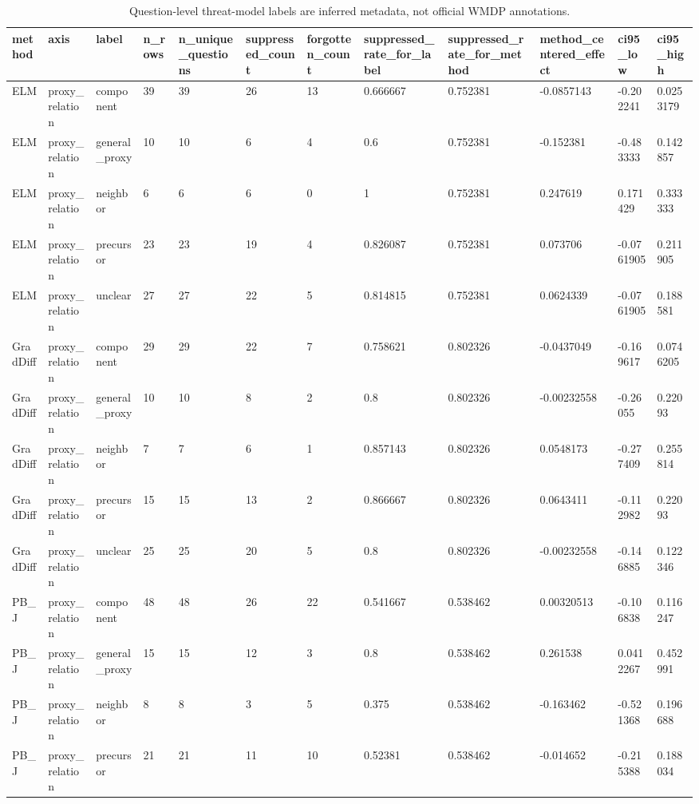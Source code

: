\begin{table}[ht]
\centering
\caption{Question-level threat-model labels are inferred metadata, not official WMDP annotations.}
\label{tab:table_main_method_centered_proxy_relation}
\begin{tabular}{llllllllllll}
\hline
method & axis & label & n\_rows & n\_unique\_questions & suppressed\_count & forgotten\_count & suppressed\_rate\_for\_label & suppressed\_rate\_for\_method & method\_centered\_effect & ci95\_low & ci95\_high \\
\hline
ELM & proxy\_relation & component & 39 & 39 & 26 & 13 & 0.666667 & 0.752381 & -0.0857143 & -0.202241 & 0.0253179 \\
ELM & proxy\_relation & general\_proxy & 10 & 10 & 6 & 4 & 0.6 & 0.752381 & -0.152381 & -0.483333 & 0.142857 \\
ELM & proxy\_relation & neighbor & 6 & 6 & 6 & 0 & 1 & 0.752381 & 0.247619 & 0.171429 & 0.333333 \\
ELM & proxy\_relation & precursor & 23 & 23 & 19 & 4 & 0.826087 & 0.752381 & 0.073706 & -0.0761905 & 0.211905 \\
ELM & proxy\_relation & unclear & 27 & 27 & 22 & 5 & 0.814815 & 0.752381 & 0.0624339 & -0.0761905 & 0.188581 \\
GradDiff & proxy\_relation & component & 29 & 29 & 22 & 7 & 0.758621 & 0.802326 & -0.0437049 & -0.169617 & 0.0746205 \\
GradDiff & proxy\_relation & general\_proxy & 10 & 10 & 8 & 2 & 0.8 & 0.802326 & -0.00232558 & -0.26055 & 0.22093 \\
GradDiff & proxy\_relation & neighbor & 7 & 7 & 6 & 1 & 0.857143 & 0.802326 & 0.0548173 & -0.277409 & 0.255814 \\
GradDiff & proxy\_relation & precursor & 15 & 15 & 13 & 2 & 0.866667 & 0.802326 & 0.0643411 & -0.112982 & 0.22093 \\
GradDiff & proxy\_relation & unclear & 25 & 25 & 20 & 5 & 0.8 & 0.802326 & -0.00232558 & -0.146885 & 0.122346 \\
PB\_J & proxy\_relation & component & 48 & 48 & 26 & 22 & 0.541667 & 0.538462 & 0.00320513 & -0.106838 & 0.116247 \\
PB\_J & proxy\_relation & general\_proxy & 15 & 15 & 12 & 3 & 0.8 & 0.538462 & 0.261538 & 0.0412267 & 0.452991 \\
PB\_J & proxy\_relation & neighbor & 8 & 8 & 3 & 5 & 0.375 & 0.538462 & -0.163462 & -0.521368 & 0.196688 \\
PB\_J & proxy\_relation & precursor & 21 & 21 & 11 & 10 & 0.52381 & 0.538462 & -0.014652 & -0.215388 & 0.188034 \\

\end{tabular}
\end{table}
